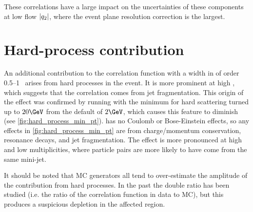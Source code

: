 These correlations have a large impact on the uncertainties of these components at low flow $|q_{2}|$, where the event plane resolution correction is the largest.



\FloatBarrier
\section{Hard-process contribution}
\label{sec:jet_frag}

An additional contribution to the correlation function with a width in \qinv of order 0.5--1 \GeV\ arises from hard processes in the event.
It is more prominent at high \kt, which suggests that the correlation comes from jet fragmentation.
This origin of the effect was confirmed by running \Hijing with the minimum \pt for hard scattering turned up to $20 \GeV$ from the default of $2 \GeV$, which causes this feature to diminish (see \cref{fig:hard_process_min_pt}).
\Hijing has no Coulomb or Bose-Einstein effects, so any effects in \cref{fig:hard_process_min_pt} are from charge/momentum conservation, resonance decays, and jet fragmentation.
The effect is more pronounced at high \kt and low multiplicities, where particle pairs are more likely to have come from the same mini-jet.

It should be noted that MC generators all tend to over-estimate the amplitude of the contribution from hard processes.
In the past the double ratio has been studied (i.e. the ratio of the correlation function in data to MC), but this produces a suspicious depletion in the affected \qinv region.


